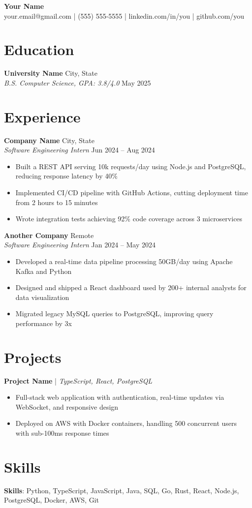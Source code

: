 \documentclass[11pt,letterpaper]{article}
\begin{document}
\begin{center}
  {\Large \textbf{Your Name}} \\
  \vspace{2pt}
  your.email@gmail.com \quad | \quad (555) 555-5555 \quad | \quad linkedin.com/in/you \quad | \quad github.com/you
\end{center}

\vspace{8pt}

\section*{Education}
\textbf{University Name} \hfill City, State \\
\textit{B.S. Computer Science, GPA: 3.8/4.0} \hfill May 2025

\section*{Experience}
\textbf{Company Name} \hfill City, State \\
\textit{Software Engineering Intern} \hfill Jun 2024 -- Aug 2024
\begin{itemize}
  \item Built a REST API serving 10k requests/day using Node.js and PostgreSQL, reducing response latency by 40\%
  \item Implemented CI/CD pipeline with GitHub Actions, cutting deployment time from 2 hours to 15 minutes
  \item Wrote integration tests achieving 92\% code coverage across 3 microservices
\end{itemize}

\textbf{Another Company} \hfill Remote \\
\textit{Software Engineering Intern} \hfill Jan 2024 -- May 2024
\begin{itemize}
  \item Developed a real-time data pipeline processing 50GB/day using Apache Kafka and Python
  \item Designed and shipped a React dashboard used by 200+ internal analysts for data visualization
  \item Migrated legacy MySQL queries to PostgreSQL, improving query performance by 3x
\end{itemize}

\section*{Projects}
\textbf{Project Name} | \textit{TypeScript, React, PostgreSQL}
\begin{itemize}
  \item Full-stack web application with authentication, real-time updates via WebSocket, and responsive design
  \item Deployed on AWS with Docker containers, handling 500 concurrent users with sub-100ms response times
\end{itemize}

\section*{Skills}
\textbf{Skills}: Python, TypeScript, JavaScript, Java, SQL, Go, Rust, React, Node.js, PostgreSQL, Docker, AWS, Git
\end{document}
